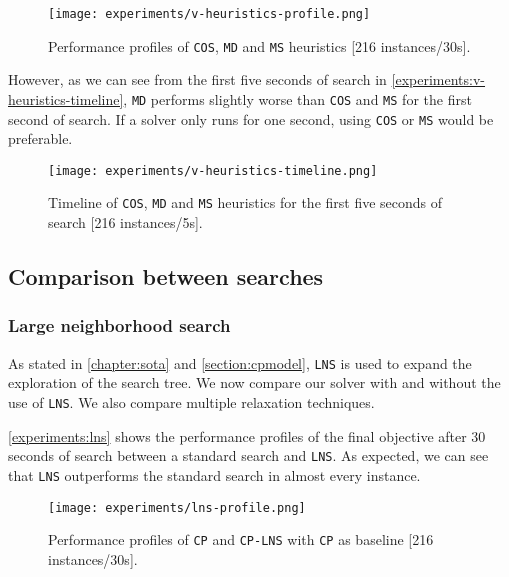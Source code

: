 \documentclass[../../thesis.tex]{subfiles}
\begin{document}
\begin{figure}
  \centering
  \texttt{[image: experiments/v-heuristics-profile.png]}
  \caption{Performance profiles of \texttt{COS}, \texttt{MD} and \texttt{MS} heuristics [216 instances/30s].}
  \label{experiments:v-heuristics-profile}
\end{figure}

However, as we can see from the first five seconds of search in \autoref{experiments:v-heuristics-timeline}, \texttt{MD} performs slightly worse than \texttt{COS} and \texttt{MS} for the first second of search. If a solver only runs for 
one second, using \texttt{COS} or \texttt{MS} would be preferable.

\begin{figure}
  \centering
  \texttt{[image: experiments/v-heuristics-timeline.png]}
  \caption{Timeline of \texttt{COS}, \texttt{MD} and \texttt{MS} heuristics for the first five seconds of search [216 instances/5s].}
  \label{experiments:v-heuristics-timeline}
\end{figure}

\FloatBarrier

\subsection{Comparison between searches}

\subsubsection{Large neighborhood search}


As stated in \autoref{chapter:sota} and \autoref{section:cpmodel}, \texttt{LNS} is used to expand the exploration
of the search tree. We now compare our solver with and without the use of \texttt{LNS}. We also compare multiple 
relaxation techniques.


\autoref{experiments:lns} shows the performance profiles of the final objective after 30 seconds of search 
between a standard search and \texttt{LNS}. As expected, we can see that \texttt{LNS} outperforms the standard search 
in almost every instance. 

\begin{figure}[H]
  \centering
  \texttt{[image: experiments/lns-profile.png]}
  \caption{Performance profiles of \texttt{CP} and \texttt{CP-LNS} with \texttt{CP} as baseline [216 instances/30s].}
  \label{experiments:lns}
\end{figure}
\end{document}
